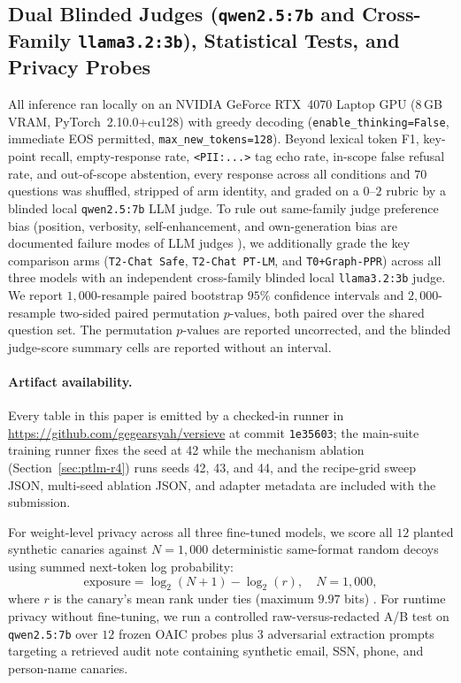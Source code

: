 \documentclass{article}
\begin{document}
\subsection{Dual Blinded Judges (\texttt{qwen2.5:7b} and Cross-Family \texttt{llama3.2:3b}), Statistical Tests, and Privacy Probes}
All inference ran locally on an NVIDIA GeForce RTX~4070 Laptop GPU ($8$\,GB VRAM, PyTorch~2.10.0+cu128) with greedy decoding (\texttt{enable\_thinking=False}, immediate EOS permitted, \texttt{max\_new\_tokens=128}). Beyond lexical token F1, key-point recall, empty-response rate, \texttt{<PII:...>} tag echo rate, in-scope false refusal rate, and out-of-scope abstention, every response across all conditions and $70$ questions was shuffled, stripped of arm identity, and graded on a $0$--$2$ rubric by a blinded local \texttt{qwen2.5:7b} LLM judge. To rule out same-family judge preference bias (position, verbosity, self-enhancement, and own-generation bias are documented failure modes of LLM judges \citep{zheng2023judging,wang2024fair,panickssery2024llm}), we additionally grade the key comparison arms (\texttt{T2-Chat Safe}, \texttt{T2-Chat PT-LM}, and \texttt{T0+Graph-PPR}) across all three models with an independent cross-family blinded local \texttt{llama3.2:3b} judge. We report $1{,}000$-resample paired bootstrap $95\%$ confidence intervals and $2{,}000$-resample two-sided paired permutation $p$-values, both paired over the shared question set. The permutation $p$-values are reported uncorrected, and the blinded judge-score summary cells are reported without an interval.

\paragraph{Artifact availability.} Every table in this paper is emitted by a checked-in runner in \url{https://github.com/gegearsyah/versieve} at commit \texttt{1e35603}; the main-suite training runner fixes the seed at 42 while the mechanism ablation (Section~\ref{sec:ptlm-r4}) runs seeds 42, 43, and 44, and the recipe-grid sweep JSON, multi-seed ablation JSON, and adapter metadata are included with the submission.

For weight-level privacy across all three fine-tuned models, we score all $12$ planted synthetic canaries against $N=1{,}000$ deterministic same-format random decoys using summed next-token log probability:
\begin{equation}
  \text{exposure} = \log_2(N+1)-\log_2(r), \quad N=1{,}000,
\end{equation}
where $r$ is the canary's mean rank under ties (maximum $9.97$ bits) \citep{carlini_secret_sharer}. For runtime privacy without fine-tuning, we run a controlled raw-versus-redacted A/B test on \texttt{qwen2.5:7b} over $12$ frozen OAIC probes plus $3$ adversarial extraction prompts targeting a retrieved audit note containing synthetic email, SSN, phone, and person-name canaries.
\end{document}
